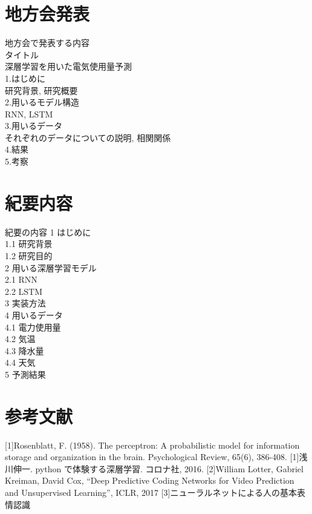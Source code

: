 \section{地方会発表}
地方会で発表する内容\\
タイトル\\
深層学習を用いた電気使用量予測\\
1.はじめに\\
研究背景, 研究概要\\
2.用いるモデル構造\\
RNN, LSTM\\
3.用いるデータ\\
それぞれのデータについての説明, 相関関係\\
4.結果\\
5.考察\\

\section{紀要内容}
紀要の内容
1 はじめに\\
1.1 研究背景\\
1.2 研究目的\\
2 用いる深層学習モデル\\
2.1 RNN\\
2.2 LSTM\\
3 実装方法\\
4 用いるデータ\\
4.1 電力使用量\\
4.2 気温\\
4.3 降水量\\
4.4 天気\\
5 予測結果\\

\section{参考文献}
[1]Rosenblatt, F. (1958). The perceptron: A probabilistic model for information storage and organization in the brain. Psychological Review, 65(6), 386-408.
[1]浅川伸一. python で体験する深層学習. コロナ社, 2016.
[2]William Lotter, Gabriel Kreiman, David Cox, “Deep Predictive Coding Networks for Video Prediction and Unsupervised Learning”, ICLR, 2017
[3]ニューラルネットによる人の基本表情認識 



